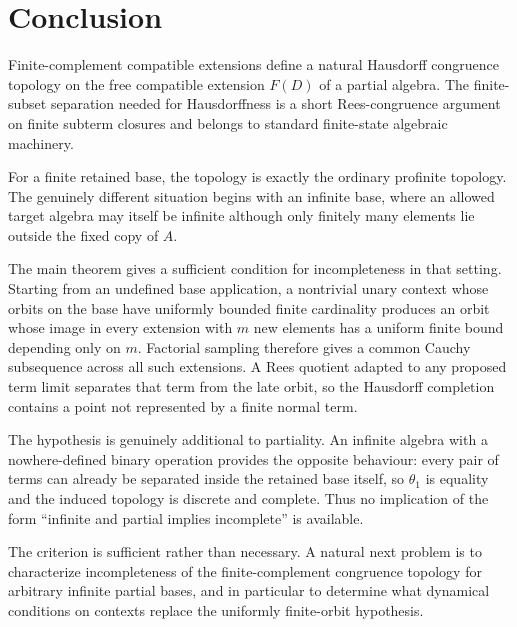\section{Conclusion}

Finite-complement compatible extensions define a natural Hausdorff congruence
topology on the free compatible extension $F(D)$ of a partial algebra.  The
finite-subset separation needed for Hausdorffness is a short Rees-congruence
argument on finite subterm closures and belongs to standard finite-state
algebraic machinery.

For a finite retained base, the topology is exactly the ordinary profinite
topology.  The genuinely different situation begins with an infinite base,
where an allowed target algebra may itself be infinite although only finitely
many elements lie outside the fixed copy of $A$.

The main theorem gives a sufficient condition for incompleteness in that
setting.  Starting from an undefined base application, a nontrivial unary
context whose orbits on the base have uniformly bounded finite cardinality
produces an orbit whose image in every extension with $m$ new elements has a
uniform finite bound depending only on $m$.  Factorial sampling therefore gives
a common Cauchy subsequence across all such extensions.  A Rees quotient
adapted to any proposed term limit separates that term from the late orbit, so
the Hausdorff completion contains a point not represented by a finite normal
term.

The hypothesis is genuinely additional to partiality.  An infinite algebra
with a nowhere-defined binary operation provides the opposite behaviour: every
pair of terms can already be separated inside the retained base itself, so
$\theta_1$ is equality and the induced topology is discrete and complete.
Thus no implication of the form ``infinite and partial implies incomplete'' is
available.

The criterion is sufficient rather than necessary.  A natural next problem is
to characterize incompleteness of the finite-complement congruence topology for
arbitrary infinite partial bases, and in particular to determine what dynamical
conditions on contexts replace the uniformly finite-orbit hypothesis.
